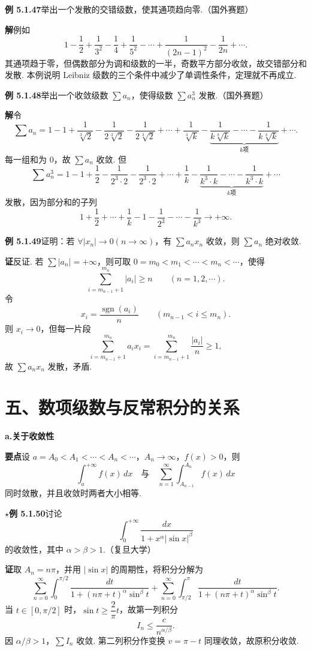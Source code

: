 \documentclass[UTF8, 12pt, fontset=fandol, oneside]{ctexart}
\begin{document}
\noindent\textbf{例 5.1.47}\quad 举出一个发散的交错级数，使其通项趋向零.（国外赛题）

\noindent\textbf{解}\quad 例如
\[
  1-\frac12+\frac1{3^2}-\frac14+\frac1{5^2}-\cdots
  +\frac1{(2n-1)^2}-\frac1{2n}+\cdots.
\]
其通项趋于零，但偶数部分为调和级数的一半，奇数平方部分收敛，故交错部分和发散. 本例说明 Leibniz 级数的三个条件中减少了单调性条件，定理就不再成立.

\noindent\textbf{例 5.1.48}\quad 举出一个收敛级数 $\displaystyle\sum a_n$，使得级数 $\displaystyle\sum a_n^3$ 发散.（国外赛题）

\noindent\textbf{解}\quad 令
\[
  \sum a_n=1-1+\frac1{\sqrt[3]2}-\frac1{2\sqrt[3]2}-\frac1{2\sqrt[3]2}
  +\cdots+\frac1{\sqrt[3]k}
  -\underbrace{\frac1{k\sqrt[3]k}-\cdots-\frac1{k\sqrt[3]k}}_{k\text{项}}+\cdots.
\]
每一组和为 $0$，故 $\sum a_n$ 收敛. 但
\[
  \sum a_n^3
  =1-1+\frac12-\frac1{2^3\cdot2}-\frac1{2^3\cdot2}
  +\cdots+\frac1k-\underbrace{\frac1{k^3\cdot k}-\cdots-\frac1{k^3\cdot k}}_{k\text{项}}+\cdots
\]
发散，因为部分和的子列
\[
  1+\frac12+\cdots+\frac1k-1-\frac1{2^3}-\cdots-\frac1{k^3}\to+\infty.
\]

\noindent\textbf{例 5.1.49}\quad 证明：若 $\forall |x_n|\to0(n\to\infty)$，有 $\displaystyle\sum a_nx_n$ 收敛，则 $\displaystyle\sum a_n$ 绝对收敛.

\noindent\textbf{证}\quad 反证. 若 $\displaystyle\sum |a_n|=+\infty$，则可取
$0=m_0<m_1<\cdots<m_n<\cdots$，使得
\[
  \sum_{i=m_{n-1}+1}^{m_n}|a_i|\ge n\qquad(n=1,2,\cdots).
\]
令
\[
  x_i=\frac{\operatorname{sgn}(a_i)}n
  \qquad(m_{n-1}<i\le m_n).
\]
则 $x_i\to0$，但每一片段
\[
  \sum_{i=m_{n-1}+1}^{m_n}a_ix_i
  =\sum_{i=m_{n-1}+1}^{m_n}\frac{|a_i|}{n}\ge1,
\]
故 $\sum a_nx_n$ 发散，矛盾.

\section*{五、数项级数与反常积分的关系}

\noindent\textbf{a.\quad 关于收敛性}

\noindent\textbf{要点}\quad 设 $a=A_0<A_1<\cdots<A_n<\cdots$，$A_n\to\infty$，$f(x)>0$，则
\[
  \int_a^{+\infty}f(x)\,dx
  \quad\text{与}\quad
  \sum_{n=1}^{\infty}\int_{A_{n-1}}^{A_n}f(x)\,dx
\]
同时敛散，并且收敛时两者大小相等.

\noindent\textbf{$\star$例 5.1.50}\quad 讨论
\[
  \int_0^{+\infty}\frac{dx}{1+x^\alpha|\sin x|^\beta}
\]
的收敛性，其中 $\alpha>\beta>1$.（复旦大学）

\noindent\textbf{证}\quad 取 $A_n=n\pi$，并用 $|\sin x|$ 的周期性，将积分分解为
\[
  \sum_{n=0}^{\infty}\int_0^{\pi/2}
  \frac{dt}{1+(n\pi+t)^\alpha\sin^\beta t}
  +\sum_{n=0}^{\infty}\int_{\pi/2}^{\pi}
  \frac{dt}{1+(n\pi+t)^\alpha\sin^\beta t}.
\]
当 $t\in[0,\pi/2]$ 时，$\sin t\ge\dfrac2\pi t$，故第一列积分
\[
  I_n\le\frac c{n^{\alpha/\beta}}.
\]
因 $\alpha/\beta>1$，$\sum I_n$ 收敛. 第二列积分作变换 $v=\pi-t$ 同理收敛，故原积分收敛.
\end{document}
